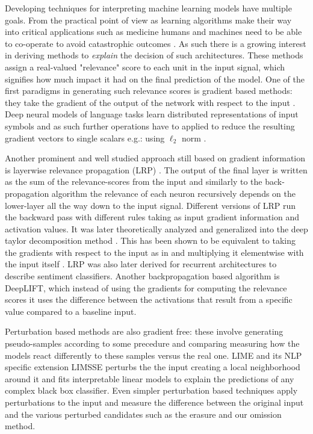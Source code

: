 Developing techniques for interpreting machine learning models have multiple goals.
From the practical point of view as learning algorithms make their way into critical applications
such as medicine humans and machines need to be able to co-operate to avoid catastrophic
outcomes \cite{caruana2015intelligible}. As such there is a growing interest in deriving methods
to \emph{explain} the decision of such architectures.
These methods assign a real-valued "relevance" score to each unit in the input signal,
which signifies how much impact it had on the final prediction of the model.
One of the first paradigms in generating such relevance scores is gradient based methods:
they take the gradient of the output of the network with respect to the input \cite{simonyan2013deep}.
Deep neural models of language tasks learn distributed representations of input symbols
and as such further operations have to applied to reduce the resulting gradient vectors to
single scalars e.g.: using $\ell_2$ norm \cite{bansal2016ask}.

Another prominent and well studied
approach still based on gradient information is layerwise
relevance propagation (LRP) \cite{bach2015pixel}. The output of the final layer
is written as the sum of the relevance-scores from the input and similarly to the back-propagation
algorithm the relevance of each neuron
recursively depends on the lower-layer all the way down to the input signal.
Different versions of LRP run the backward pass with different rules taking as
input gradient information and activation values. It was later theoretically analyzed and generalized
into the deep taylor decomposition method \cite{binder2016layer}.
This has been shown to be equivalent to taking the
gradients with respect to the input as in \citep{simonyan2013deep} and multiplying it elementwise
with the input itself \cite{shrikumar2017learning}.
LRP was also later derived for recurrent architectures \cite{arras2017explaining} to describe
sentiment classifiers. Another backpropagation based algorithm is DeepLIFT, which instead of
using the gradients for computing the relevance scores it uses the difference between the activations
that result from a specific value compared to a baseline input.

Perturbation based methods are also gradient free: these involve generating
pseudo-samples according to some precedure and comparing measuring how the models
react differently to these samples versus the real one.
LIME \cite{ribeiro2016should} and its NLP specific extension LIMSSE
\cite{poerner2018evaluating} perturbs the
the input creating a local neighborhood around it and fits interpretable linear models to explain
the predictions of any complex black box classifier.
Even simpler perturbation based techniques apply perturbations to the input and measure the
difference between the original input and the various perturbed candidates such as the erasure
\cite{li2016understanding} and our omission \cite{Kadar2016} method.

